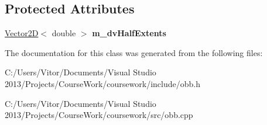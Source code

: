 \subsection*{Protected Attributes}
\begin{DoxyCompactItemize}
\item 
\hypertarget{class_o_b_b_a4e81d2a5c71b24ee0b52cc176f48f272}{}\hyperlink{class_vector2_d}{Vector2\+D}$<$ double $>$ {\bfseries m\+\_\+dv\+Half\+Extents}\label{class_o_b_b_a4e81d2a5c71b24ee0b52cc176f48f272}

\end{DoxyCompactItemize}


The documentation for this class was generated from the following files\+:\begin{DoxyCompactItemize}
\item 
C\+:/\+Users/\+Vitor/\+Documents/\+Visual Studio 2013/\+Projects/\+Course\+Work/coursework/include/obb.\+h\item 
C\+:/\+Users/\+Vitor/\+Documents/\+Visual Studio 2013/\+Projects/\+Course\+Work/coursework/src/obb.\+cpp\end{DoxyCompactItemize}
